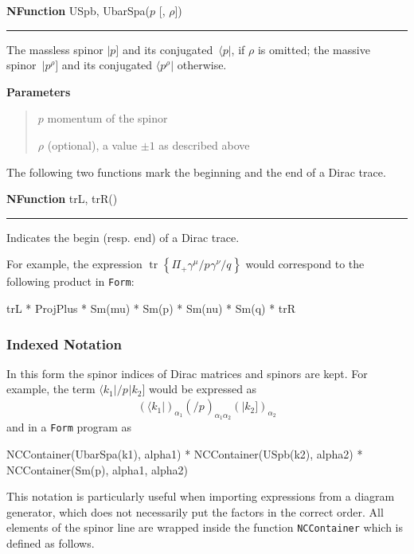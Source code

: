 \documentclass[preprint,number,12pt,sort&compress]{elsarticle}
\DeclareMathOperator{\Trace}{tr}
\newcommand{\fmslash}[1]{\ensuremath{/\!\!\!{#1}}}
\newcommand{\pslash}[1][{}]{\fmslash{p}_{#1}}
\newcommand{\qslash}[1][{}]{\fmslash{q}_{#1}}
\newcommand{\tr}[2][{}]{\Trace^{#1}\!\left\{{#2}\right\}}
\newcommand{\FORM}{{\texttt{Form}}}
\newcommand{\bra}[1]{\langle #1 \vert}
\newcommand{\keb}[1]{\vert #1 ]}
\newcommand{\Spab}[1]{\langle #1]}
\newlength{\funcindent}
\newlength{\funcwidth}
\newenvironment{Ventry}[1]%
 {\begin{list}{}{%
   \renewcommand{\makelabel}[1]{\texttt{##1:}\hfil}%
   \settowidth{\labelwidth}{\texttt{#1:}}%
   \setlength{\leftmargin}{\labelsep}%
   \addtolength{\leftmargin}{\labelwidth}}}%
 {\end{list}}
\newenvironment{NFunction}[2]{%
\hspace{.8\funcindent}\begin{boxedminipage}{\funcwidth}
	\raggedright \textbf{NFunction} #1(#2)

	\vspace{-1.5ex}

	\rule{\textwidth}{0.5\fboxrule}
	\setlength{\parskip}{2ex}
}{\end{boxedminipage}}
\newenvironment{Parameters}{%
	\setlength{\parskip}{1ex}
	\textbf{Parameters}
	\vspace{-1ex}
	\begin{quote}}{%
	\end{quote}}
\begin{document}
\medskip
\begin{NFunction}{USpb, UbarSpa}{$p$ [, $\rho$]}
   The massless spinor $\keb{p}$ and its conjugated~$\bra{p}$,
	if $\rho$ is omitted;
	the massive spinor~$\keb{p^\rho}$ and its conjugated $\bra{p^\rho}$
	otherwise.

	\begin{Parameters}
		\begin{Ventry}{$\rho$}
			\item[$p$] momentum of the spinor
			\item[$\rho$] (optional), a value $\pm1$ as described above
		\end{Ventry}
	\end{Parameters}
\end{NFunction}

\medskip
The following two functions mark the beginning and the end
of a Dirac trace.

\medskip
\begin{NFunction}{trL, trR}{}
   Indicates the begin (resp. end) of a Dirac trace.
\end{NFunction}

\medskip
For example, the expression $\tr{\Pi_+\gamma^\mu\pslash\gamma^\nu\qslash}$
would correspond to the following product in \FORM{}:
\begin{spform}
trL * ProjPlus * Sm(mu) * Sm(p) * Sm(nu) * Sm(q) * trR
\end{spform}

\subsubsection{Indexed Notation}
In this form the spinor indices of Dirac matrices and spinors are kept.
For example, the term $\Spab{k_1\vert\pslash\vert k_2}$ would be expressed as
\begin{displaymath}
(\bra{k_1})_{\alpha_1} (\pslash)_{\alpha_1\alpha_2} (\keb{k_2})_{\alpha_2}
\end{displaymath}
and in a \FORM{} program as
\begin{spform}
NCContainer(UbarSpa(k1), alpha1) *
NCContainer(USpb(k2), alpha2) *
NCContainer(Sm(p), alpha1, alpha2)
\end{spform}

This notation is particularly useful when importing expressions from a
diagram generator, which does not necessarily put the factors in the
correct order. All elements of the spinor line are wrapped inside
the function \texttt{NCContainer} which is defined as follows.
\end{document}
